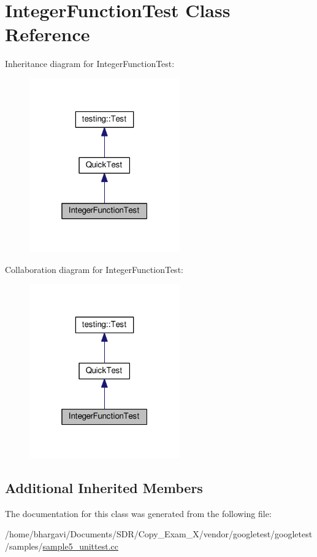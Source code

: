 \hypertarget{class_integer_function_test}{}\section{Integer\+Function\+Test Class Reference}
\label{class_integer_function_test}


Inheritance diagram for Integer\+Function\+Test\+:
\nopagebreak
\begin{figure}[H]
\begin{center}
\leavevmode
\includegraphics[width=184pt]{class_integer_function_test__inherit__graph}
\end{center}
\end{figure}


Collaboration diagram for Integer\+Function\+Test\+:
\nopagebreak
\begin{figure}[H]
\begin{center}
\leavevmode
\includegraphics[width=184pt]{class_integer_function_test__coll__graph}
\end{center}
\end{figure}
\subsection*{Additional Inherited Members}


The documentation for this class was generated from the following file\+:\begin{DoxyCompactItemize}
\item 
/home/bhargavi/\+Documents/\+S\+D\+R/\+Copy\+\_\+\+Exam\+\_\+X/vendor/googletest/googletest/samples/\hyperlink{sample5__unittest_8cc}{sample5\+\_\+unittest.\+cc}\end{DoxyCompactItemize}
